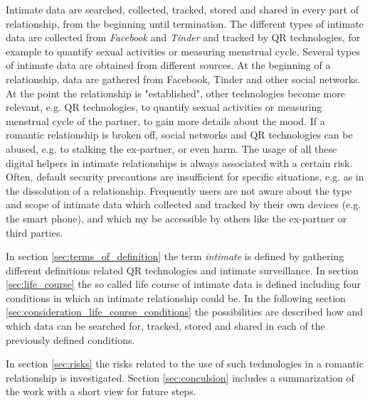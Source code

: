 Intimate data are searched, collected, tracked, stored and shared in every part of relationship, from the beginning until termination.
The different types of intimate data are collected from \textit{Facebook} and \textit{Tinder} and tracked by \acl{QR} technologies, for example to quantify sexual activities or measuring menstrual cycle.
Several types of intimate data are obtained from different sources. At the beginning of a relationship, data are gathered from Facebook, Tinder and other social networks.
At the point the relationship is "established", other technologies become more relevant, e.g. \acs{QR} technologies, to quantify sexual activities or measuring menstrual cycle of the partner, to gain more details about the mood.
If a romantic relationship is broken off, social networks and \acs{QR} technologies can be abused, e.g. to stalking the ex-partner, or even harm. 
The usage of all these digital helpers in intimate relationships is always associated with a certain risk.
Often, default security precautions are insufficient for specific situations, e.g. as in the dissolution of a relationship. 
Frequently users are not aware about the type and scope of intimate data which collected and tracked by their own devices (e.g. the smart phone), and which my be accessible by others like the ex-partner or third parties.

In section \ref{sec:terms_of_definition} the term \textit{intimate} is defined by gathering different definitions related \acs{QR} technologies and intimate surveillance.
In section \ref{sec:life_course} the so called life course of intimate data is defined including four conditions in which an intimate relationship could be.
In the following section \ref{sec:consideration_life_course_conditions} the possibilities are described how and which data can be searched for, tracked, stored and shared in each of the previously defined conditions.

In section \ref{sec:risks} the risks related to the use of such technologies in a romantic relationship is investigated.
Section \ref{sec:conculsion} includes a summarization of the work with a short view for future steps.